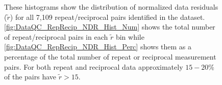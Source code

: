 \documentclass[final,authoryear,5p,times,twocolumn]{elsarticle}
\begin{document}
\begin{figure} [!ht]
\begin{center}
\end{center}
\caption{These histograms show the distribution of normalized data residuals ($\tilde{r}$) for all 7,109 repeat/reciprocal pairs identified in the dataset. \ref{fig:DataQC_RepRecip_NDR_Hist_Num} shows the total number of repeat/reciprocal pairs in each $\tilde{r}$ bin while \ref{fig:DataQC_RepRecip_NDR_Hist_Perc} shows them as a percentage of the total number of repeat or reciprocal measurement pairs. For both repeat and reciprocal data approximately $15 - 20\%$ of the pairs have $\tilde{r} > 15$.} 
\label{fig:DataQC_RepRecip_NDR_Hist}
\end{figure}     
\end{document}
